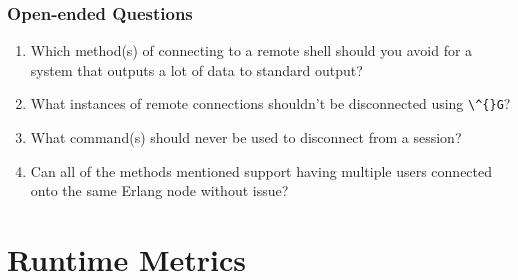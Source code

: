 \documentclass[11pt, oneside]{book}   	%
\newcommand{\command}[1]{\Verb`#1`}
\begin{document}
\subsection{Open-ended Questions}

\begin{enumerate}
	\item Which method(s) of connecting to a remote shell should you avoid for a system that outputs a lot of data to standard output?
	\item What instances of remote connections shouldn't be disconnected using \command{\^{}G}?
	\item What command(s) should never be used to disconnect from a session?
	\item Can all of the methods mentioned support having multiple users connected onto the same Erlang node without issue?
\end{enumerate}



\chapter{Runtime Metrics}
\label{chap:runtime-metrics}
\end{document}
